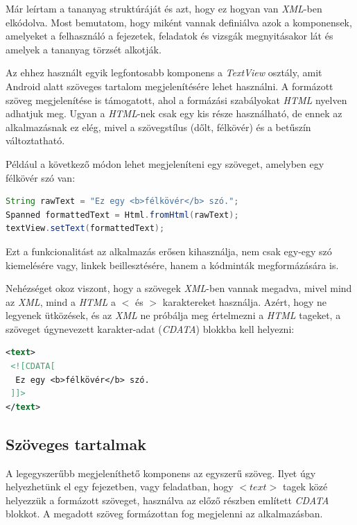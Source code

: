 \documentclass[12pt,a4paper]{article}
\newcommand{\xml}{\textit{XML}\xspace}
\begin{document}
	Már leírtam a tananyag struktúráját és azt, hogy ez hogyan van \xml-ben elkódolva. Most bemutatom, hogy miként vannak definiálva azok a komponensek, amelyeket a felhasználó a fejezetek, feladatok és vizsgák megnyitásakor lát és amelyek a tananyag törzsét alkotják.
	
	Az ehhez használt egyik legfontosabb komponens a \textit{TextView} osztály, amit Android alatt szöveges tartalom megjelenítésére lehet használni. A formázott szöveg megjelenítése is támogatott, ahol a formázási szabályokat \textit{HTML} nyelven adhatjuk meg. Ugyan a \textit{HTML}-nek csak egy kis része használható, de ennek az alkalmazásnak ez elég, mivel a szövegstílus (dőlt, félkövér) és a betűszín változtatható.
	
	Például a következő módon lehet megjeleníteni egy szöveget, amelyben egy félkövér szó van:
	
	\bigskip
	\begin{lstlisting}[language=Java]
String rawText = "Ez egy <b>félkövér</b> szó.";
Spanned formattedText = Html.fromHtml(rawText);
textView.setText(formattedText);
	\end{lstlisting}
	\bigskip
	
	Ezt a funkcionalitást az alkalmazás erősen kihasználja, nem csak egy-egy szó kiemelésére vagy, linkek beillesztésére, hanem a kódminták megformázására is.
	
	Nehézséget okoz viszont, hogy a szövegek \textit{XML}-ben vannak megadva, mivel mind az \xml, mind a \textit{HTML} a $<$ és $>$ karaktereket használja. Azért, hogy ne legyenek ütközések, és az \xml ne próbálja meg értelmezni a \textit{HTML} tageket, a szöveget úgynevezett karakter-adat (\textit{CDATA}) blokkba kell helyezni:
	
	\bigskip
	\begin{lstlisting}[language=XML]
<text>
 <![CDATA[
  Ez egy <b>félkövér</b> szó.
 ]]>
</text>
	\end{lstlisting}
	
	\subsection{Szöveges tartalmak}
	
	A legegyszerűbb megjeleníthető komponens az egyszerű szöveg. Ilyet úgy helyezhetünk el egy fejezetben, vagy feladatban, hogy $<text>$ tagek közé helyezzük a formázott szöveget, használva az előző részben említett \textit{CDATA} blokkot. A megadott szöveg formázottan fog megjelenni az alkalmazásban.
	
\end{document}
